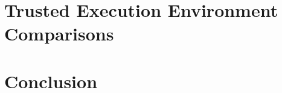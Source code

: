 \documentclass[12pt,oneside,letterpaper]{PSUreport}
\begin{document}
\glsresetall
\chapter{Trusted Execution Environment Comparisons}
\label{chap:comp}


\glsresetall
\chapter{Conclusion}
\label{chap:fini}




\end{document}
